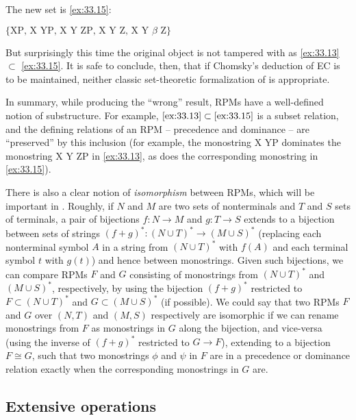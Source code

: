 \documentclass[output=paper]{langsci/langscibook}
\begin{document}
\noindent The new set is \eqref{ex:33.15}:

\ea\label{ex:33.15} $\{\text{XP, X YP, X Y ZP, X Y Z, X Y $\beta$ Z}\}$
\z

But surprisingly this time the original object is not tampered with as
\eqref{ex:33.13} $\subset$ \eqref{ex:33.15}. It is safe to conclude,
then, that if Chomsky's deduction of \gls{EC} is to be maintained, neither
classic set-theoretic formalization of  is appropriate.

In summary, while producing the \enquote{wrong} result, \glspl{RPM} have a
well-defined notion of substructure. For example, $\eqref{ex:33.13}\subset
\eqref{ex:33.15}$ is a subset relation, and the defining relations of an
\gls{RPM} -- precedence and dominance -- are \enquote{preserved} by this
inclusion (for example, the monostring X YP dominates the monostring X Y ZP in
\eqref{ex:33.13}, as does the corresponding monostring in
\eqref{ex:33.15}).

There is also a clear notion of \emph{isomorphism} between R\glspl{PM}, which
will be important in . Roughly, if $N$ and $M$ are two sets of nonterminals
and $T$ and $S$ sets of terminals, a pair of bijections $f: N\rightarrow M$ and
$g:T\rightarrow S$ extends to a bijection between sets of strings $(f+g)^*:
(N\cup T)^*\rightarrow (M\cup S)^*$ (replacing each nonterminal symbol $A$ in a
string from $(N\cup T)^*$ with $f(A)$ and each terminal symbol $t$ with
$g(t)$) and hence between monostrings. Given such bijections, we can compare
R\glspl{PM} $F$ and $G$ consisting of monostrings from $(N\cup T)^*$ and
$(M\cup S)^*$, respectively, by using the bijection $(f+g)^*$ restricted to
$F\subset(N\cup T)^*$ and $G\subset (M\cup S)^*$ (if possible). We could say
that two \glspl{RPM} $F$ and $G$ over $(N,T)$  and $(M,S)$ respectively are
isomorphic if we can rename monostrings from $F$ as monostrings in $G$ along
the bijection, and vice-versa (using the inverse of $(f+g)^*$ restricted to
$G\rightarrow F$), extending to a bijection $F\cong G$, such that two
monostrings $\phi$ and $\psi$ in $F$ are in a precedence or dominance relation
exactly when the corresponding monostrings in $G$ are.

\subsection{Extensive operations}
\end{document}
